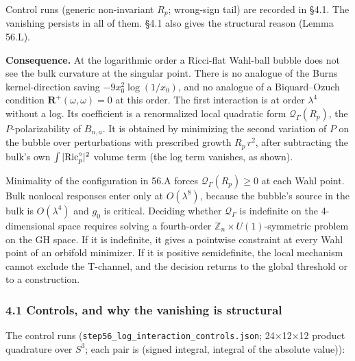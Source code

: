\documentclass[
  10pt,
]{report}
\begin{document}
Control runs (generic non-invariant \(R_p\); wrong-sign tail) are
recorded in §4.1. The vanishing persists in all of them. §4.1 also gives
the structural reason (Lemma 56.L).

\textbf{Consequence.} At the logarithmic order a Ricci-flat Wahl-ball
bubble does not see the bulk curvature at the singular point. There is
no analogue of the Burns kernel-direction saving \(-9x_0^2\log(1/x_0)\),
and no analogue of a Biquard--Ozuch condition
\(\mathbf R^+(\omega,\omega)=0\) at this order. The first interaction is
at order \(\lambda^4\) without a log. Its coefficient is a renormalized
local quadratic form \(\mathcal Q_\Gamma(R_p)\), the
\(P\)-polarizability of \(B_{n,a}\). It is obtained by minimizing the
second variation of \(P\) on the bubble over perturbations with
prescribed growth \(R_p\,r^2\), after subtracting the bulk's own
\(\int|{\rm Ric}^\circ_p|^2\) volume term (the log term vanishes, as
shown).

Minimality of the configuration in 56.A forces
\(\mathcal Q_\Gamma(R_p)\ge0\) at each Wahl point. Bulk nonlocal
responses enter only at \(O(\lambda^8)\), because the bubble's source in
the bulk is \(O(\lambda^4)\) and \(g_0\) is critical. Deciding whether
\(\mathcal Q_\Gamma\) is indefinite on the 4-dimensional space requires
solving a fourth-order \(\mathbb Z_n\times U(1)\)-symmetric problem on
the GH space. If it is indefinite, it gives a pointwise constraint at
every Wahl point of an orbifold minimizer. If it is positive
semidefinite, the local mechanism cannot exclude the T-channel, and the
decision returns to the global threshold or to a construction.

\hypertarget{controls-and-why-the-vanishing-is-structural}{%
\subsubsection{4.1 Controls, and why the vanishing is
structural}\label{controls-and-why-the-vanishing-is-structural}}

The control runs (\texttt{step56\_log\_interaction\_controls.json};
24×12×12 product quadrature over \(S^3\); each pair is (signed integral,
integral of the absolute value)):
\end{document}
